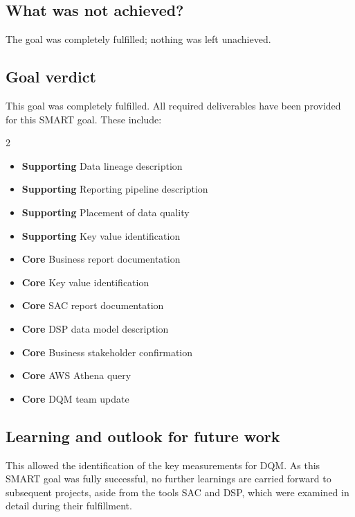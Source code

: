 \subsection*{What was not achieved?}

The goal was completely fulfilled; nothing was left unachieved.


\subsection*{Goal verdict}
This goal was completely fulfilled. All required deliverables have been provided for this SMART goal.
These include:
\begin{multicols}{2}
\begin{itemize}
    \item \textbf{Supporting} Data lineage description
    \item \textbf{Supporting} Reporting pipeline description
    \item \textbf{Supporting} Placement of data quality
    \item \textbf{Supporting} Key value identification    
    \item \textbf{Core} Business report documentation
    \item \textbf{Core} Key value identification
    \item \textbf{Core} SAC report documentation
    \item \textbf{Core} DSP data model description
    \item \textbf{Core} Business stakeholder confirmation
    \item \textbf{Core} AWS Athena query 
    \item \textbf{Core} DQM team update
\end{itemize}
\end{multicols}


\subsection*{Learning and outlook for future work}

This allowed the identification of the key measurements for DQM. As this SMART goal was fully successful, no further learnings are carried forward to subsequent projects, aside from the tools SAC and DSP, which were examined in detail during their fulfillment.